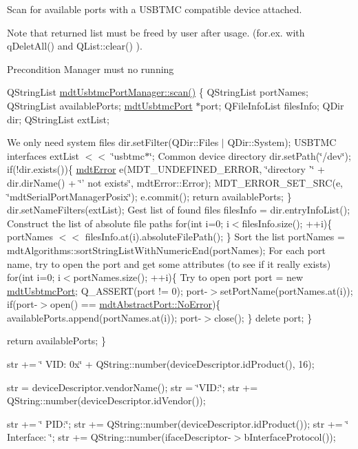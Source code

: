 Scan for available ports with a USBTMC compatible device attached. 

Note that returned list must be freed by user after usage. (for.ex. with qDeletAll() and QList::clear() ).

\begin{DoxyPrecond}{Precondition}
Manager must no running
\end{DoxyPrecond}
QStringList \hyperlink{classmdt_usbtmc_port_manager_a992d1227810186d3c7dc166452e2e3b6}{mdtUsbtmcPortManager::scan()} \{ QStringList portNames; QStringList availablePorts; \hyperlink{classmdt_usbtmc_port}{mdtUsbtmcPort} $\ast$port; QFileInfoList filesInfo; QDir dir; QStringList extList;

We only need system files dir.setFilter(QDir::Files $|$ QDir::System); USBTMC interfaces extList $<$$<$ \char`\"{}usbtmc$\ast$\char`\"{}; Common device directory dir.setPath(\char`\"{}/dev\char`\"{}); if(!dir.exists())\{ \hyperlink{classmdt_error}{mdtError} e(MDT\_\-UNDEFINED\_\-ERROR, \char`\"{}directory '\char`\"{} + dir.dirName() + \char`\"{}' not exists\char`\"{}, mdtError::Error); MDT\_\-ERROR\_\-SET\_\-SRC(e, \char`\"{}mdtSerialPortManagerPosix\char`\"{}); e.commit(); return availablePorts; \} dir.setNameFilters(extList); Gest list of found files filesInfo = dir.entryInfoList(); Construct the list of absolute file paths for(int i=0; i$<$filesInfo.size(); ++i)\{ portNames $<$$<$ filesInfo.at(i).absoluteFilePath(); \} Sort the list portNames = mdtAlgorithms::sortStringListWithNumericEnd(portNames); For each port name, try to open the port and get some attributes (to see if it really exists) for(int i=0; i$<$portNames.size(); ++i)\{ Try to open port port = new \hyperlink{classmdt_usbtmc_port}{mdtUsbtmcPort}; Q\_\-ASSERT(port != 0); port-\/$>$setPortName(portNames.at(i)); if(port-\/$>$open() == \hyperlink{classmdt_abstract_port_ad4121bb930c95887e77f8bafa065a85eab898bd273effe5cb4ed1a399a2d4baad}{mdtAbstractPort::NoError})\{ availablePorts.append(portNames.at(i)); port-\/$>$close(); \} delete port; \}

return availablePorts; \} 

str += \char`\"{} VID: 0x\char`\"{} + QString::number(deviceDescriptor.idProduct(), 16);

str = deviceDescriptor.vendorName(); str = \char`\"{}VID:\char`\"{}; str += QString::number(deviceDescriptor.idVendor());

str += \char`\"{} PID:\char`\"{}; str += QString::number(deviceDescriptor.idProduct()); str += \char`\"{} Interface: \char`\"{}; str += QString::number(ifaceDescriptor-\/$>$bInterfaceProtocol());



